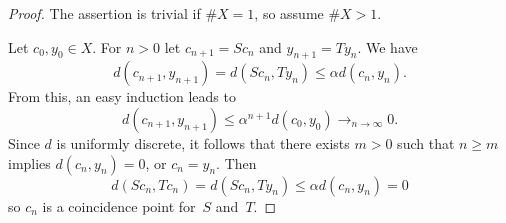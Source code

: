 \documentclass[10pt,a4paper]{amsart}
\begin{document}
\begin{proof}
The assertion is trivial if $\#X = 1$, so
assume $\#X > 1$.

    Let $c_0,y_0 \in X$. For $n>0$ let
    $c_{n+1} = Sc_n$ and $y_{n+1} = Ty_n$. We
    have
    \[ d(c_{n+1},y_{n+1}) =
       d(Sc_n, Ty_n) \le
       \alpha d(c_n, y_n).
    \]
    From this, an easy induction leads to
    \[ d(c_{n+1},y_{n+1}) \le
    \alpha^{n+1} d(c_0, y_0) 
    \to_{n \to \infty} 0.
    \]
    Since $d$ is uniformly discrete, it
    follows that there exists $m > 0$ such 
    that $n \ge m$ implies $d(c_n,y_n) = 0$,
    or $c_n = y_n$. Then
    \[ d(Sc_n,Tc_n) = d(Sc_n, Ty_n) \le
      \alpha d(c_n,y_n) = 0
    \]
    so $c_n$ is a
    coincidence point for~$S$ and~$T$.
\end{proof}
\end{document}
